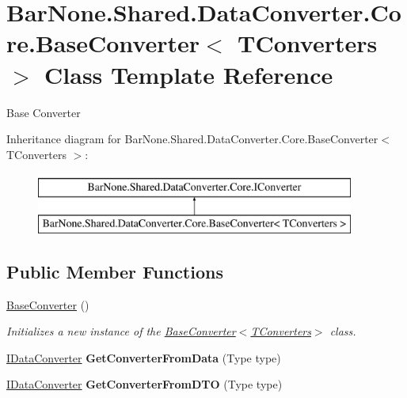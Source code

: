 \hypertarget{class_bar_none_1_1_shared_1_1_data_converter_1_1_core_1_1_base_converter}{}\section{Bar\+None.\+Shared.\+Data\+Converter.\+Core.\+Base\+Converter$<$ T\+Converters $>$ Class Template Reference}
\label{class_bar_none_1_1_shared_1_1_data_converter_1_1_core_1_1_base_converter}


Base Converter  


Inheritance diagram for Bar\+None.\+Shared.\+Data\+Converter.\+Core.\+Base\+Converter$<$ T\+Converters $>$\+:\begin{figure}[H]
\begin{center}
\leavevmode
\includegraphics[height=2.000000cm]{class_bar_none_1_1_shared_1_1_data_converter_1_1_core_1_1_base_converter}
\end{center}
\end{figure}
\subsection*{Public Member Functions}
\begin{DoxyCompactItemize}
\item 
\mbox{\hyperlink{class_bar_none_1_1_shared_1_1_data_converter_1_1_core_1_1_base_converter_a93868363b26ecdb92ab3f14cb7aceb88}{Base\+Converter}} ()
\begin{DoxyCompactList}\small\item\em Initializes a new instance of the \mbox{\hyperlink{class_bar_none_1_1_shared_1_1_data_converter_1_1_core_1_1_base_converter_a93868363b26ecdb92ab3f14cb7aceb88}{Base\+Converter$<$\+T\+Converters$>$}} class. \end{DoxyCompactList}\item 
\mbox{\label{class_bar_none_1_1_shared_1_1_data_converter_1_1_core_1_1_base_converter_a4961089607a438fe36e3936e5fa14db0}} 
\mbox{\hyperlink{interface_bar_none_1_1_shared_1_1_data_converter_1_1_core_1_1_i_data_converter}{I\+Data\+Converter}} {\bfseries Get\+Converter\+From\+Data} (Type type)
\item 
\mbox{\label{class_bar_none_1_1_shared_1_1_data_converter_1_1_core_1_1_base_converter_a6a64c97e2e3dce42826731aa3ae1da96}} 
\mbox{\hyperlink{interface_bar_none_1_1_shared_1_1_data_converter_1_1_core_1_1_i_data_converter}{I\+Data\+Converter}} {\bfseries Get\+Converter\+From\+D\+TO} (Type type)
\end{DoxyCompactItemize}
